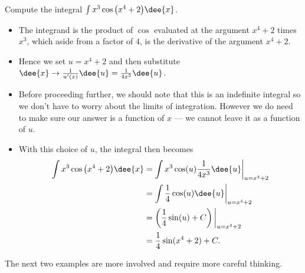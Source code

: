 \begin{eg}\label{eg:substitution7}
Compute the integral $\int x^3\cos\big(x^4+2\big)\dee{x}$.


\soln
\begin{itemize}
 \item The integrand is the product of $\cos$ evaluated at the argument $x^4+2$ times
$x^3$, which aside from a factor of $4$, is the derivative of the argument $x^4+2$.
\item Hence we set $u=x^4+2$ and then substitute $\dee{x} \rightarrow
\frac{1}{u'(x)}\dee{u} = \frac{1}{4x^3}\dee{u}$.

\item Before proceeding further, we should note that  this is an indefinite integral so
we
don't have to worry about the limits of integration. However we do need to make sure our
answer is a function of $x$ --- we cannot leave it as a function of $u$.

\item With this choice of $u$, the integral then becomes
\begin{align*}
  \int x^3\cos\big(x^4+2\big)\dee{x}
&= \int x^3 \cos(u) \frac{1}{4x^3}\dee{u} \bigg|_{u=x^4+2}\\
&=  \int\frac{1}{4} \cos(u) \dee{u} \bigg|_{u=x^4+2}\\
&= \left(\frac{1}{4}\sin(u)+C\right)\bigg|_{u=x^4+2} \\
&= \frac{1}{4}\sin(x^4+2) +C.
\end{align*}
\end{itemize}


\end{eg}
The next two examples are more involved and require more careful thinking.

